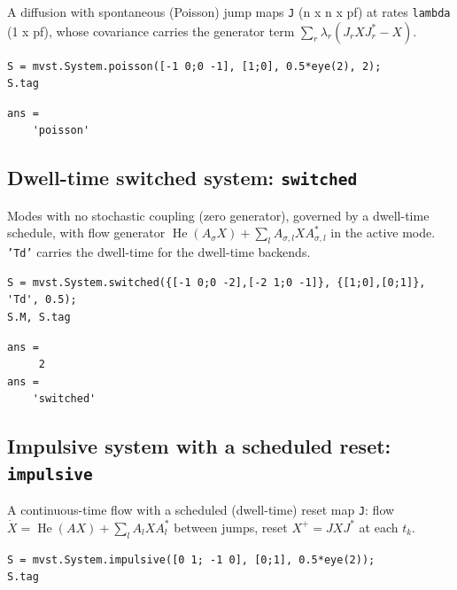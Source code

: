 \documentclass[11pt,oneside]{report}
\newcommand{\code}[1]{\texttt{#1}}
\begin{document}
A diffusion with spontaneous (Poisson) jump maps \code{J} (n x n x pf) at rates
\code{lambda} (1 x pf), whose covariance carries the generator term
\(\sum_r\lambda_r(J_r X J_r^{*}-X)\).

\begin{lstlisting}[style=matlabstyle]
S = mvst.System.poisson([-1 0;0 -1], [1;0], 0.5*eye(2), 2);
S.tag
\end{lstlisting}

\begin{lstlisting}[style=outputstyle]
ans =
    'poisson'
\end{lstlisting}

\hypertarget{dwell-time-switched-system-switched}{%
\subsection{\texorpdfstring{Dwell-time switched system: \code{switched}}{Dwell-time switched system: switched}}\label{dwell-time-switched-system-switched}}

Modes with no stochastic coupling (zero generator), governed by a dwell-time
schedule, with flow generator \(\operatorname{He}(A_\sigma X)+\sum_l A_{\sigma,l}X A_{\sigma,l}^{*}\)
in the active mode. \code{'Td'} carries the dwell-time for the dwell-time backends.

\begin{lstlisting}[style=matlabstyle]
S = mvst.System.switched({[-1 0;0 -2],[-2 1;0 -1]}, {[1;0],[0;1]}, 'Td', 0.5);
S.M, S.tag
\end{lstlisting}

\begin{lstlisting}[style=outputstyle]
ans =
     2
ans =
    'switched'
\end{lstlisting}

\hypertarget{impulsive-system-with-a-scheduled-reset-impulsive}{%
\subsection{\texorpdfstring{Impulsive system with a scheduled reset: \code{impulsive}}{Impulsive system with a scheduled reset: impulsive}}\label{impulsive-system-with-a-scheduled-reset-impulsive}}

A continuous-time flow with a scheduled (dwell-time) reset map \code{J}: flow
\(\dot X=\operatorname{He}(AX)+\sum_l A_l X A_l^{*}\) between jumps, reset
\(X^{+}=J X J^{*}\) at each \(t_k\).

\begin{lstlisting}[style=matlabstyle]
S = mvst.System.impulsive([0 1; -1 0], [0;1], 0.5*eye(2));
S.tag
\end{lstlisting}
\end{document}
